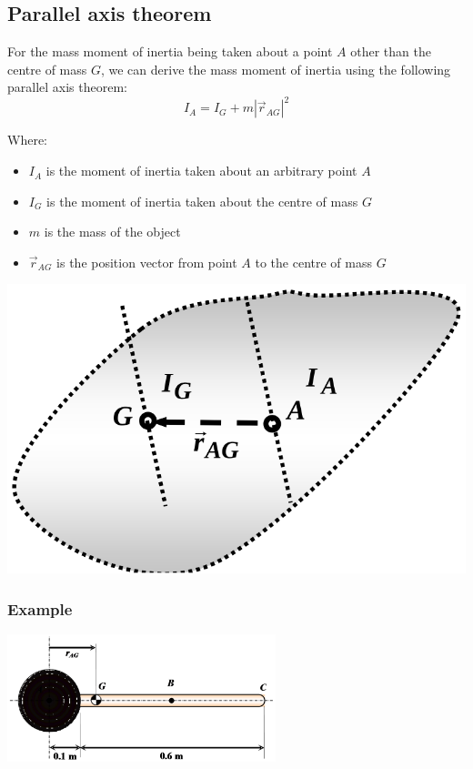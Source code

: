 \documentclass[11pt]{article}
\begin{document}
 \newpage
\subsection{Parallel axis theorem}
\label{sec:orgf6275d5}
For the mass moment of inertia being taken about a point \(A\) other than the centre of mass \(G\), we can derive the mass moment of inertia using the following parallel axis theorem:
\[I_A = I_G + m \left| \vec{r}_{AG} \right|^2\]

Where:
\begin{itemize}
\item \(I_A\) is the moment of inertia taken about an arbitrary point \(A\)
\item \(I_G\) is the moment of inertia taken about the centre of mass \(G\)
\item \(m\) is the mass of the object
\item \(\vec{r}_{AG}\) is the position vector from point \(A\) to the centre of mass \(G\)
\end{itemize}

\begin{center}
\includegraphics[width=.9\linewidth]{./images/parallel-axis-theorem-diagram.png}
\end{center}

 \newpage
\subsubsection{Example}
\label{sec:orge91c811}
\begin{center}
\includegraphics[height=10em]{./images/moment-of-inertia-example-diagram.png}
\end{center}
\end{document}
